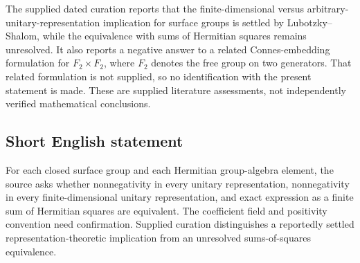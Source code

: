 \documentclass[11pt]{article}
\begin{document}
The supplied dated curation reports that the finite-dimensional versus arbitrary-unitary-representation implication for surface groups is settled by Lubotzky--Shalom, while the equivalence with sums of Hermitian squares remains unresolved. It also reports a negative answer to a related Connes-embedding formulation for \(F_2\times F_2\), where \(F_2\) denotes the free group on two generators. That related formulation is not supplied, so no identification with the present statement is made. These are supplied literature assessments, not independently verified mathematical conclusions.
\subsection{Short English statement}
For each closed surface group and each Hermitian group-algebra element, the source asks whether nonnegativity in every unitary representation, nonnegativity in every finite-dimensional unitary representation, and exact expression as a finite sum of Hermitian squares are equivalent. The coefficient field and positivity convention need confirmation. Supplied curation distinguishes a reportedly settled representation-theoretic implication from an unresolved sums-of-squares equivalence.
\end{document}
